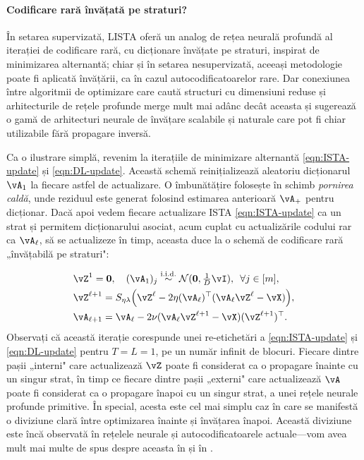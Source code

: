 \documentclass[../../book-main_ro.tex]{subfiles}
\begin{document}
\paragraph{Codificare rară învățată pe straturi?}

În setarea supervizată, LISTA oferă un analog de rețea neurală profundă al
iterației de codificare rară, cu dicționare învățate pe straturi, inspirat de
minimizarea alternantă; chiar și în setarea nesupervizată, aceeași metodologie
poate fi aplicată învățării, ca în cazul autocodificatoarelor rare.
Dar conexiunea între algoritmii de optimizare care caută structuri cu dimensiuni reduse
și arhitecturile de rețele profunde merge mult mai adânc decât aceasta și sugerează o gamă
de arhitecturi neurale de învățare scalabile și naturale care pot fi chiar utilizabile
fără propagare inversă.

Ca o ilustrare simplă, revenim la iterațiile de minimizare alternantă
\eqref{eqn:ISTA-update} și \eqref{eqn:DL-update}.
Această schemă reinițializează aleatoriu dicționarul $\vA_1$ la fiecare astfel de actualizare.
O îmbunătățire folosește în schimb \textit{pornirea caldă}, unde reziduul este
generat folosind estimarea anterioară $\vA_+$ pentru dicționar.
Dacă apoi vedem fiecare actualizare ISTA \eqref{eqn:ISTA-update} ca un strat și permitem
dicționarului asociat, acum cuplat cu actualizările codului rar ca
$\vA_\ell$, să se actualizeze în timp, aceasta duce la o schemă de
codificare rară „învățabilă pe straturi":

\begin{align}
    & \vZ^{1}
     = \Zero, \quad (\vA_{1})_j
     \simiid \dNorm(\vzero, \tfrac{1}{D}\vI), \enspace \forall j \in [m], \\ 
    & \vZ^{\ell + 1} = S_{\eta\lambda}\rp{\vZ^{\ell}
    - 2\eta(\vA_{\ell})^\top(\vA_{\ell}\vZ^{\ell}
    - \vX)},\label{eq:ISTA-update-layerwise}\\ 
    & \vA_{\ell + 1} = \vA_{\ell}- 2\nu (\vA_{\ell}\vZ^{\ell + 1}
    - \vX)(\vZ^{\ell + 1})^\top.
\end{align}
Observați că această iterație %
corespunde unei re-etichetări a \eqref{eqn:ISTA-update} și \eqref{eqn:DL-update}
pentru $T = L = 1$, pe un număr infinit de blocuri.
Fiecare dintre pașii „interni" care actualizează $\vZ$ poate fi considerat ca o
propagare înainte cu un singur strat, în timp ce fiecare dintre pașii „externi" care actualizează $\vA$ poate fi considerat
ca o propagare înapoi cu un singur strat, a unei rețele neurale profunde primitive. În
special, acesta este cel mai simplu caz în care se manifestă o diviziune clară între
optimizarea înainte și învățarea înapoi. Această diviziune este încă
observată în rețelele neurale și autocodificatoarele actuale---vom avea mult mai multe de spus despre aceasta în  și în
.
\end{document}
